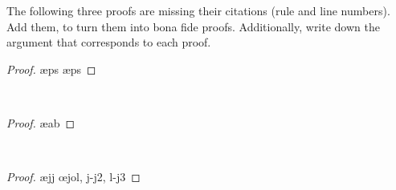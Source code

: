\problempart
The following three proofs are missing their citations (rule and line numbers). Add them, to turn them into bona fide proofs. Additionally, write down the argument that corresponds to each proof.
\begin{multicols}{2}
\begin{proof}
\ae{ps}
\ae{ps}
\end{proof}
\\

\begin{proof}
\open
	\ae{ab}
\close
{}
\end{proof}
\\
\pagebreak
\begin{proof}
\open
	\ae{jj}
\close
\open
\close
{}\oe{jol, j-j2, l-j3}
\end{proof}
\\
\end{multicols}

